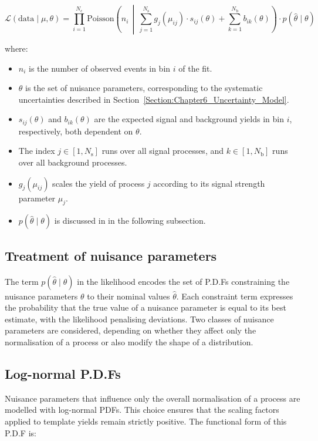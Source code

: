 \begin{equation}
\mathscr{L}(\text{data} \mid \mu, \theta) = \prod_{i=1}^{N_{\mathrm{c}}}
\mathrm{Poisson} 
\left(
n_i \,\middle|\,
\sum_{j=1}^{N_{\mathrm{s}}} g_j(\mu_{ij}) \cdot s_{ij}(\theta)
+ \sum_{k=1}^{N_{\mathrm{b}}} b_{ik}(\theta)
\right)
\cdot
p(\hat{\theta} \mid \theta)
\end{equation}

where:
\begin{itemize}
    \item $n_i$ is the number of observed events in bin $i$ of the fit.
    \item $\theta$ is the set of nuisance parameters, corresponding to the systematic uncertainties described in Section~\ref{Section:Chapter6_Uncertainty_Model}.
    \item $s_{ij}(\theta)$ and $b_{ik}(\theta)$ are the expected signal and background yields in bin $i$, respectively, both dependent on $\theta$.
    \item The index $j \in [1, N_{\mathrm{s}}]$ runs over all signal processes, and $k \in [1, N_{\mathrm{b}}]$ runs over all background processes.
    \item $g_j(\mu_{ij})$ scales the yield of process $j$ according to its signal strength parameter $\mu_j$.
    \item $p(\hat{\theta} \mid \theta)$ is discussed in in the following subsection.

\end{itemize}

\subsection{Treatment of nuisance parameters}

The term $p(\hat{\theta} \mid \theta)$ in the likelihood encodes the set of \acp{P.D.F} constraining the nuisance parameters $\theta$ to their nominal values $\hat{\theta}$. Each constraint term expresses the probability that the true value of a nuisance parameter is equal to its best estimate, with the likelihood penalising deviations. Two classes of nuisance parameters are considered, depending on whether they affect only the normalisation of a process or also modify the shape of a distribution.

\subsection{Log-normal P.D.Fs}  
Nuisance parameters that influence only the overall normalisation of a process are modelled with log-normal PDFs. This choice ensures that the scaling factors applied to template yields remain strictly positive. The functional form of this P.D.F is:

